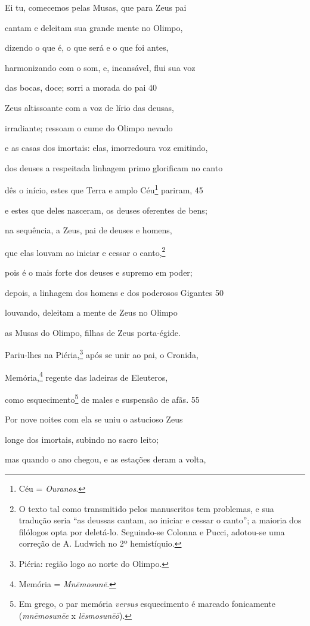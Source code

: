 Ei tu, comecemos pelas Musas, que para Zeus pai

cantam e deleitam sua grande mente no Olimpo,

dizendo o que é, o que será e o que foi antes,

harmonizando com o som, e, incansável, flui sua voz

das bocas, doce; sorri a morada do pai \num{40}

Zeus altissoante com a voz de lírio das deusas,

irradiante; ressoam o cume do Olimpo nevado

e as casas dos imortais: elas, imorredoura voz emitindo,

dos deuses a respeitada linhagem primo glorificam no canto

dês o início, estes que Terra e amplo Céu\footnote{Céu = \emph{Ouranos}.} pariram, \num{45}

e estes que deles nasceram, os deuses oferentes de bens;

na sequência, a Zeus, pai de deuses e homens,

que elas louvam ao iniciar e cessar o canto,\footnote{O texto tal como transmitido pelos manuscritos tem problemas, e sua
tradução seria ``as deussas cantam, ao iniciar e cessar o canto''; a
maioria dos filólogos opta por deletá-lo. Seguindo-se Colonna e Pucci,
adotou-se uma correção de A. Ludwich no 2º hemistíquio.}

pois é o mais forte dos deuses e supremo em poder;

depois, a linhagem dos homens e dos poderosos Gigantes \num{50}

louvando, deleitam a mente de Zeus no Olimpo

as Musas do Olimpo, filhas de Zeus porta-égide.

\quad{}Pariu-lhes na Piéria,\footnote{Piéria: região logo ao norte do Olimpo.} após se unir ao pai, o Cronida,

Memória,\footnote{Memória = \emph{Mnēmosunē}.} regente das ladeiras de Eleuteros,

como esquecimento\footnote{Em grego, o par memória \emph{versus} esquecimento é marcado fonicamente (\emph{mnēmosunēe} x \emph{lēsmosunēō}).} de males e suspensão de afãs. \num{55}

Por nove noites com ela se uniu o astucioso Zeus

longe dos imortais, subindo no sacro leito;

mas quando o ano chegou, e as estações deram a volta,

